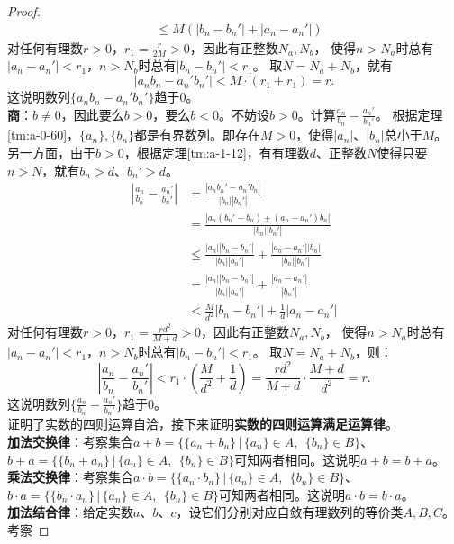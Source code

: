 \documentclass[12pt,UTF8]{ctexbook}
\begin{document}
\begin{appendix}
\begin{proof}
\begin{align*}
        &\leqslant M(|b_n - b_n'| + |a_n - a_n'|)  
    \end{align*}
    对任何有理数$r>0$，$r_1 = \frac{r}{2M}>0$，因此有正整数$N_a,N_b$，
    使得$n>N_a$时总有$|a_n - a_n'| < r_1$，$n>N_b$时总有$|b_n - b_n'| < r_1$。
    取$N=N_a+N_b$，就有
    $$ |a_nb_n - a_n'b_n'| < M\cdot \left(r_1 + r_1\right) = r.$$
    这说明数列$\{a_nb_n - a_n'b_n'\}$趋于$0$。\\
    \textbf{商}：$b\neq 0$，因此要么$b>0$，要么$b<0$。不妨设$b>0$。计算$\frac{a_n}{b_n} - \frac{a_n'}{b_n'}$。
    根据定理\ref{tm:a-0-60}，$\{a_n\}, \{b_n\}$都是有界数列。即存在$M>0$，使得$|a_n|$、$|b_n|$总小于$M$。
    另一方面，由于$b>0$，根据定理\ref{tm:a-1-12}，有有理数$d$、正整数$N$使得只要$n>N$，就有$b_n>d$、$b_n'>d$。
    \begin{align*}
        \left|\frac{a_n}{b_n} - \frac{a_n'}{b_n'}\right| &= \frac{|a_nb_n' - a_n'b_n|}{|b_n||b_n'|}  \\
        &= \frac{|a_n(b_n' - b_n) + (a_n - a_n')b_n|}{|b_n||b_n'|}  \\
        &\leqslant \frac{|a_n||b_n - b_n'|}{|b_n||b_n'|} + \frac{|a_n - a_n'||b_n|}{|b_n||b_n'|}  \\
        &= \frac{|a_n||b_n - b_n'|}{|b_n||b_n'|} + \frac{|a_n - a_n'|}{|b_n'|}  \\
        &< \frac{M}{d^2}|b_n - b_n'| + \frac{1}{d}|a_n - a_n'|  
    \end{align*}
    对任何有理数$r>0$，$r_1 = \frac{rd^2}{M+d}>0$，因此有正整数$N_a,N_b$，
    使得$n>N_a$时总有$|a_n - a_n'| < r_1$，$n>N_b$时总有$|b_n - b_n'| < r_1$。
    取$N=N_a+N_b$，则：
    $$ \left|\frac{a_n}{b_n} - \frac{a_n'}{b_n'}\right| < r_1\cdot \left(\frac{M}{d^2} + \frac{1}{d}\right) = \frac{rd^2}{M+d}\cdot \frac{M+d}{d^2} = r.$$
    这说明数列$\{\frac{a_n}{b_n} - \frac{a_n'}{b_n'}\}$趋于$0$。\\
    证明了实数的四则运算自洽，接下来证明\textbf{实数的四则运算满足运算律}。\\
    \textbf{加法交换律}：考察集合$a + b = \{\{a_n + b_n\} \, |\, \{a_n\}\in A,\;\,\{b_n\}\in B \}$、
    $b + a = \{\{b_n + a_n\} \, |\, \{a_n\}\in A,\;\,\{b_n\}\in B \}$可知两者相同。这说明$a + b = b + a$。\\
    \textbf{乘法交换律}：考察集合$a\cdot b = \{\{a_n \cdot b_n\} \, |\, \{a_n\}\in A,\;\,\{b_n\}\in B \}$、
    $b\cdot a = \{\{b_n \cdot a_n\} \, |\, \{a_n\}\in A,\;\,\{b_n\}\in B \}$可知两者相同。这说明$a \cdot b = b \cdot a$。\\
    \textbf{加法结合律}：给定实数$a$、$b$、$c$，设它们分别对应自敛有理数列的等价类$A,B,C$。考察

\end{proof}
\end{appendix}
\end{document}
